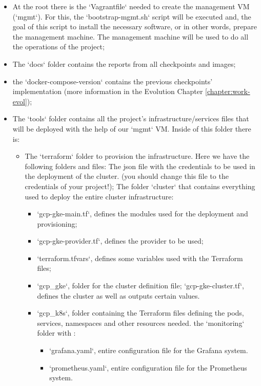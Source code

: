 \documentclass[12pt,a4paper,oneside]{report}
\begin{document}
\begin{itemize}
    \item At the root there is the `Vagrantfile` needed to create the management VM (`mgmt`). For this, the `bootstrap-mgmt.sh` script will be executed and, the goal of this script to install the necessary software, or in other words, prepare the management machine. The management machine will be used to do all the operations of the project;
    \item The `docs` folder contains the reports from all checkpoints and images;
    \item the `docker-compose-version` contains the previous checkpoints' implementation (more information in the Evolution Chapter \ref{chapter:work-evol});
    \item The `tools` folder contains all the project's infrastructure/services files that will be deployed with the help of our `mgmt` VM. Inside of this folder there is:
    \begin{itemize}
        \item The `terraform` folder to provision the infrastructure. Here we have the following folders and files:
        \subitem The json file with the credentials to be used in the deployment of the cluster. (you should change this file to the credentials of your project!);
        \subitem The folder `cluster` that contains everything used to deploy the entire cluster infrastructure:
        \begin{itemize}
            \item `gcp-gke-main.tf`, defines the modules used for the deployment and provisioning;
            \item `gcp-gke-provider.tf`, defines the provider to be used;
            \item `terraform.tfvars`, defines some variables used with the Terraform files;
            \item `gcp\_gke`, folder for the cluster definition file;
                \subitem `gcp-gke-cluster.tf`, defines the cluster as well as outputs certain values.
            \item `gcp\_k8s`, folder containing the Terraform files defining the pods, services, namespaces and other resources needed.
                \subitem the `monitoring` folder with :
                    \begin{itemize}
                        \item `grafana.yaml`, entire configuration file for the Grafana system.
                        \item `prometheus.yaml`, entire configuration file for the Prometheus system.

\end{itemize}
\end{itemize}
\end{itemize}
\end{itemize}
\end{document}
